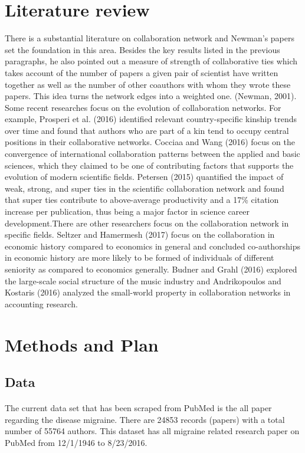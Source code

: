 \documentclass[12pt]{article}
\begin{document}
\section{Literature review}
There is a substantial literature on collaboration network and Newman's papers set the foundation in this area. Besides the key results listed in the previous paragraphs, he also pointed out a measure of strength of collaborative ties which takes account of the number of papers a given pair of scientist have written together as well as the number of other coauthors with whom they wrote these papers. This idea turns the network edges into a weighted one. (Newman, 2001). Some recent researches focus on the evolution of collaboration networks. For example, Prosperi et al. (2016) identified relevant country-specific kinship trends over time and found that authors who are part of a kin tend to occupy central positions in their collaborative networks. Cocciaa and Wang (2016) focus on the convergence of international collaboration patterns between the applied and basic sciences, which they claimed to be one of contributing factors that supports the evolution of modern scientific fields.  Petersen (2015) quantified the impact of weak, strong, and super ties in the scientific collaboration network and found that super ties contribute to above-average productivity and a 17\% citation increase per publication, thus being a major factor in science career development.There are other researchers focus on the collaboration network in specific fields. Seltzer and Hamermesh (2017) focus on the collaboration in economic history compared to economics in general and concluded co-authorships in economic history are more likely to be formed of individuals of different seniority as compared to economics generally. Budner and Grahl (2016) explored the large-scale social structure of the music industry and Andrikopoulos and Kostaris (2016) analyzed the small-world property in collaboration networks in accounting research.

\section{Methods and Plan}
\subsection{Data}
\paragraph{}
The current data set that has been scraped from PubMed is the all paper regarding the disease migraine. There are 24853 records (papers) with a total number of 55764 authors. This dataset has all migraine related research paper on PubMed from 12/1/1946 to 8/23/2016. 
\end{document}
